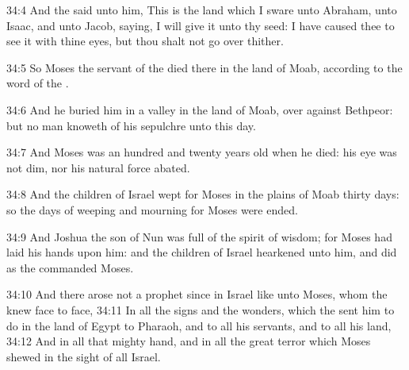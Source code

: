 34:4 And the \LORD said unto him, This is the land which I sware unto Abraham, unto Isaac, and unto Jacob, saying, I will give it unto thy seed: I have caused thee to see it with thine eyes, but thou shalt not go over thither.

34:5 So Moses the servant of the \LORD died there in the land of Moab, according to the word of the \LORD.

34:6 And he buried him in a valley in the land of Moab, over against Bethpeor: but no man knoweth of his sepulchre unto this day.

34:7 And Moses was an hundred and twenty years old when he died: his eye was not dim, nor his natural force abated.

34:8 And the children of Israel wept for Moses in the plains of Moab thirty days: so the days of weeping and mourning for Moses were ended.

34:9 And Joshua the son of Nun was full of the spirit of wisdom; for Moses had laid his hands upon him: and the children of Israel hearkened unto him, and did as the \LORD commanded Moses.

34:10 And there arose not a prophet since in Israel like unto Moses, whom the \LORD knew face to face, 34:11 In all the signs and the wonders, which the \LORD sent him to do in the land of Egypt to Pharaoh, and to all his servants, and to all his land, 34:12 And in all that mighty hand, and in all the great terror which Moses shewed in the sight of all Israel.


